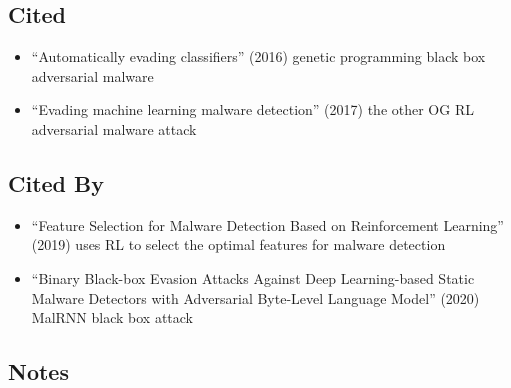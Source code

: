 \documentclass{article}
\begin{document}
\subsection*{Cited}
\begin{itemize}
	\item ``Automatically evading classifiers'' (2016) genetic programming black box adversarial malware
	\item ``Evading machine learning malware detection'' (2017) the other OG RL adversarial malware attack
\end{itemize}

\subsection*{Cited By}
\begin{itemize}
	\item ``Feature Selection for Malware Detection Based on Reinforcement Learning'' (2019) uses RL to select the optimal features for malware detection
	\item ``Binary Black-box Evasion Attacks Against Deep Learning-based Static Malware Detectors with Adversarial Byte-Level Language Model'' (2020) MalRNN black box attack
\end{itemize}

\subsection*{Notes}
\end{document}
